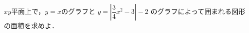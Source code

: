 \documentclass[../../main.tex]{subfiles}
\begin{document}
$xy$平面上で，$y=x$のグラフと
$y= \left| \displaystyle\dfrac{3}{4}x^2-3 \right| - 2$
のグラフによって囲まれる図形の面積を求めよ．
\end{document}

